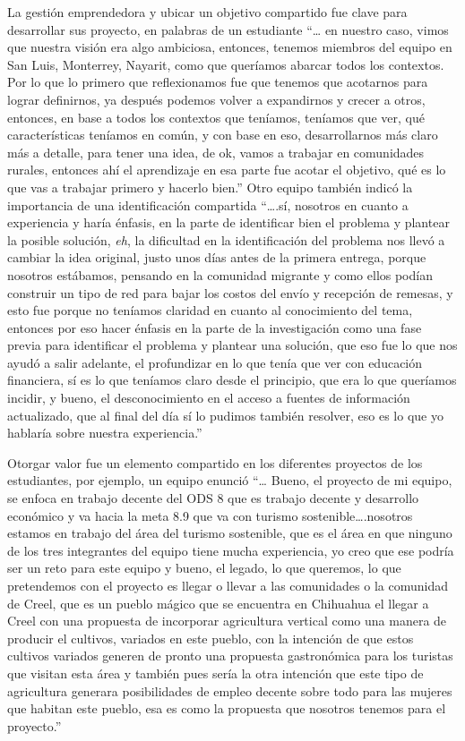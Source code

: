 \documentclass[spanish]{textolivre}
\begin{document}
La gestión emprendedora y ubicar un objetivo compartido fue clave para desarrollar sus proyecto, en palabras de un estudiante “… en nuestro caso, vimos que nuestra visión era algo ambiciosa, entonces, tenemos miembros del equipo en San Luis, Monterrey, Nayarit, como que queríamos abarcar todos los contextos. Por lo que lo primero que reflexionamos fue que tenemos que acotarnos para lograr definirnos, ya después podemos volver a expandirnos y crecer a otros, entonces, en base a todos los contextos que teníamos, teníamos que ver, qué características teníamos en común, y con base en eso, desarrollarnos más claro más a detalle, para tener una idea, de ok, vamos a trabajar en comunidades rurales, entonces ahí el aprendizaje en esa parte fue acotar el objetivo, qué es lo que vas a trabajar primero y hacerlo bien.” Otro equipo también indicó la importancia de una identificación compartida “….sí, nosotros en cuanto a experiencia y haría énfasis, en la parte de identificar bien el problema y plantear la posible solución, \emph{eh}, la dificultad en la identificación del problema nos llevó a cambiar la idea original, justo unos días antes de la primera entrega, porque nosotros estábamos, pensando en la comunidad migrante y como ellos podían construir un tipo de red para bajar los costos del envío y recepción de remesas, y esto fue porque no teníamos claridad en cuanto al conocimiento del tema, entonces por eso hacer énfasis en la parte de la investigación como una fase previa para identificar el problema y plantear una solución, que eso fue lo que nos ayudó a salir adelante, el profundizar en lo que tenía que ver con educación financiera, sí es lo que teníamos claro desde el principio, que era lo que queríamos incidir, y bueno, el desconocimiento en el acceso a fuentes de información actualizado, que al final del día sí lo pudimos también resolver, eso es lo que yo hablaría sobre nuestra experiencia.”

Otorgar valor fue un elemento compartido en los diferentes proyectos de los estudiantes, por ejemplo, un equipo enunció “… Bueno, el proyecto de mi equipo, se enfoca en trabajo decente del ODS 8 que es trabajo decente y desarrollo económico y va hacia la meta 8.9 que va con turismo sostenible….nosotros estamos en trabajo del área del turismo sostenible, que es el área en que ninguno de los tres integrantes del equipo tiene mucha experiencia, yo creo que ese podría ser un reto para este equipo y bueno, el legado, lo que queremos, lo que pretendemos con el proyecto es llegar o llevar a las comunidades o la comunidad de Creel, que es un pueblo mágico que se encuentra en Chihuahua el llegar a Creel con una propuesta de incorporar agricultura vertical como una manera de producir el cultivos, variados en este pueblo, con la intención de que estos cultivos variados generen de pronto  una propuesta gastronómica para los turistas que visitan esta área y también pues sería la otra intención que este tipo de agricultura generara posibilidades de empleo decente sobre todo para las mujeres que habitan este pueblo, esa es como la propuesta que nosotros tenemos para el proyecto.”
\end{document}
